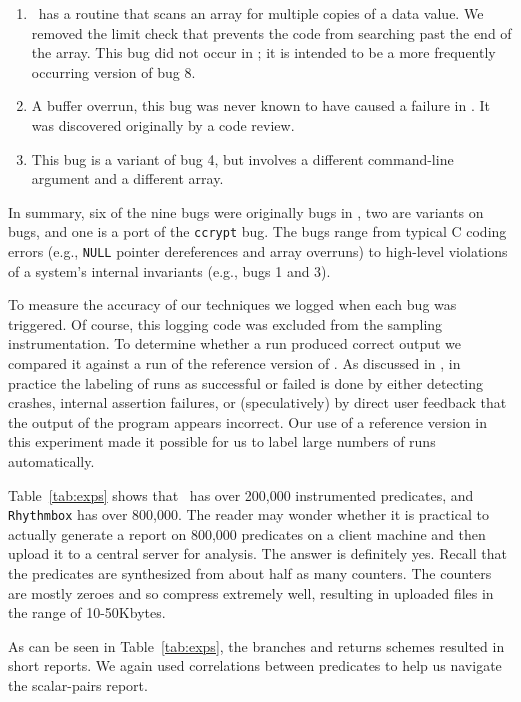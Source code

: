 \begin{enumerate}
\item \moss\ has a routine that scans an array for multiple copies of a data value.
We removed the limit check that prevents the code from searching past the end of the array.  
This bug did not occur in \moss; it is intended to be a more frequently occurring version of bug 8.

\item  A buffer overrun, this bug was never known to have caused a failure in \moss. It
was discovered originally by a code review.

\item This bug is a variant of bug 4, but involves a different command-line argument and
a different array.
\end{enumerate}

In summary, six of the nine bugs were originally bugs in \moss, two are variants on \moss bugs, and one
is a port of the {\tt ccrypt} bug.  The bugs
range from typical C coding errors (e.g., \texttt{NULL} pointer dereferences
and array overruns) to high-level violations of a system's internal
invariants (e.g., bugs 1 and 3).

To measure the accuracy of our techniques we logged 
when each bug was triggered.  Of course, this logging 
code was excluded from the sampling instrumentation.
To determine whether a run produced correct output we compared it against a run
of the reference version of \moss.  As discussed in ,
in practice the labeling of runs as successful or failed is done by either detecting
crashes, internal assertion failures, or (speculatively) by direct user feedback that the output
of the program appears incorrect.  Our use of a reference version in this experiment made
it possible for us to label large numbers of runs automatically.

Table~\ref{tab:exps} shows that \moss\ has over 200,000 instrumented predicates,
and {\tt Rhythmbox} has over 800,000.
The reader may wonder whether it is practical to actually generate a report on
800,000 predicates on a client machine and then upload it to a central
server for analysis.  The answer is definitely yes.  Recall
that the predicates are synthesized from about half as many counters.
The counters are mostly zeroes and so compress extremely well,
resulting in uploaded files in the range of 10-50Kbytes.

As can be seen in Table~\ref{tab:exps}, the branches and returns schemes
resulted in short reports.  We again used correlations between predicates to help us navigate
the scalar-pairs report.

